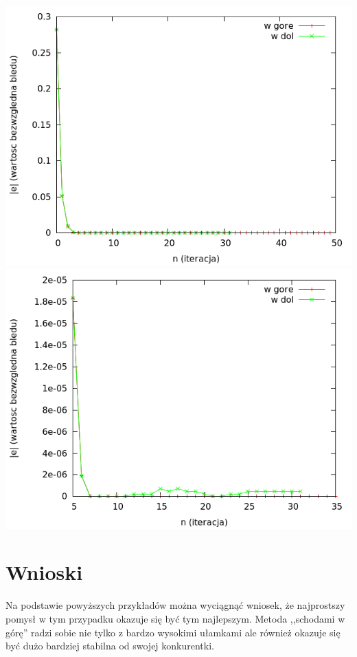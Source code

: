 \documentclass[11pt,leqno]{article}
\begin{document}
\begin{center}
\includegraphics[scale=0.65,natwidth=640,natheight=480]{plot/e50err.png}\\
\includegraphics[scale=0.65,natwidth=640,natheight=480]{plot/e50errzoom.png}\\
\end{center}


\section{Wnioski}

Na podstawie powyższych przykładów można wyciągnąć wniosek, że najprostszy pomysł w tym przypadku okazuje się być tym najlepszym. Metoda ,,schodami w górę'' radzi sobie nie tylko z bardzo wysokimi ułamkami ale również okazuje się być dużo bardziej stabilna od swojej konkurentki.
\end{document}
